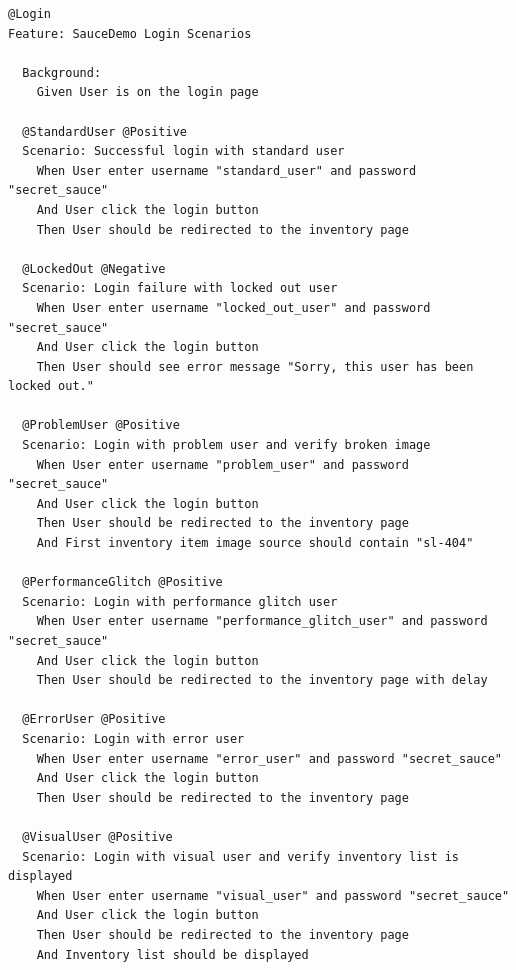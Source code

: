 \documentclass[a4paper,oneside,11pt]{book}
\begin{document}
\begin{lstlisting}[caption=Berkas login.feature, language={}]
@Login
Feature: SauceDemo Login Scenarios

  Background:
    Given User is on the login page

  @StandardUser @Positive
  Scenario: Successful login with standard user
    When User enter username "standard_user" and password "secret_sauce"
    And User click the login button
    Then User should be redirected to the inventory page

  @LockedOut @Negative
  Scenario: Login failure with locked out user
    When User enter username "locked_out_user" and password "secret_sauce"
    And User click the login button
    Then User should see error message "Sorry, this user has been locked out."

  @ProblemUser @Positive
  Scenario: Login with problem user and verify broken image
    When User enter username "problem_user" and password "secret_sauce"
    And User click the login button
    Then User should be redirected to the inventory page
    And First inventory item image source should contain "sl-404"

  @PerformanceGlitch @Positive
  Scenario: Login with performance glitch user
    When User enter username "performance_glitch_user" and password "secret_sauce"
    And User click the login button
    Then User should be redirected to the inventory page with delay

  @ErrorUser @Positive
  Scenario: Login with error user
    When User enter username "error_user" and password "secret_sauce"
    And User click the login button
    Then User should be redirected to the inventory page

  @VisualUser @Positive
  Scenario: Login with visual user and verify inventory list is displayed
    When User enter username "visual_user" and password "secret_sauce"
    And User click the login button
    Then User should be redirected to the inventory page
    And Inventory list should be displayed
\end{lstlisting}
\end{document}
